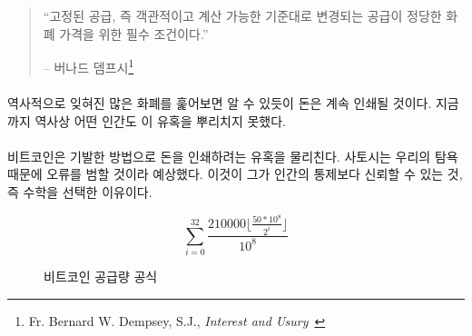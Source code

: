\begin{quotation}\begin{samepage}
		\begin{comment}	
			\enquote{A fixed money supply, or a supply altered only in accord with
				objective and calculable criteria, is a necessary condition to a
				meaningful just price of money.}
		\end{comment}
		\enquote{고정된 공급, 즉 객관적이고 계산 가능한 기준대로 변경되는 공급이 정당한 화폐 가격을 위한 필수 조건이다.}
		\begin{flushright} -- 버나드 뎀프시\footnote{Fr. Bernard W. Dempsey, S.J., \textit{Interest and Usury}~\cite[p.~210]{dempsey_interest_1943}}
\end{flushright}\end{samepage}\end{quotation}

\newpage

\paragraph{}
\begin{comment}	
	As a quick stroll through the graveyard of forgotten currencies has
	shown, money which can be printed will be printed. So far, no human in
	history was able to resist this temptation.
\end{comment}
역사적으로 잊혀진 많은 화폐를 훑어보면 알 수 있듯이 돈은 계속 인쇄될 것이다. 
지금까지 역사상 어떤 인간도 이 유혹을 뿌리치지 못했다.

\paragraph{}
\begin{comment}	
	Bitcoin does away with the temptation to print money in an ingenious
	way. Satoshi was aware of our greed and fallibility --- this is why he
	chose something more reliable than human restraint: mathematics.
\end{comment}
비트코인은 기발한 방법으로 돈을 인쇄하려는 유혹을 물리친다. 
사토시는 우리의 탐욕 때문에 오류를 범할 것이라 예상했다.
이것이 그가 인간의 통제보다 신뢰할 수 있는 것, 즉 수학을 선택한 이유이다.

\begin{figure}
	\centering
	\begin{equation}
		\sum\limits_{i=0}^{32} \frac{210000 \lfloor \frac{50*10^8}{2^i} \rfloor}{10^8}
	\end{equation}
	\caption{비트코인 공급량 공식}
	\label{fig:supply-formula-white}
\end{figure}

